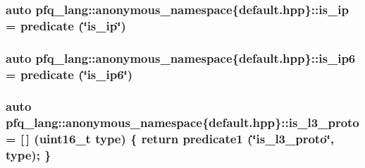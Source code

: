 \hypertarget{namespacepfq__lang_1_1anonymous__namespace_02default_8hpp_03_a43ee18537268245a58354e044a134df5}{
\subsubsection[{is\+\_\+ip}]{\setlength{\rightskip}{0pt plus 5cm}auto pfq\+\_\+lang\+::anonymous\+\_\+namespace\{default.\+hpp\}\+::is\+\_\+ip = {\bf predicate} (\char`\"{}is\+\_\+ip\char`\"{})}}\label{namespacepfq__lang_1_1anonymous__namespace_02default_8hpp_03_a43ee18537268245a58354e044a134df5}
\hypertarget{namespacepfq__lang_1_1anonymous__namespace_02default_8hpp_03_a107437a3539c86e92035db62e88b7d81}{
\subsubsection[{is\+\_\+ip6}]{\setlength{\rightskip}{0pt plus 5cm}auto pfq\+\_\+lang\+::anonymous\+\_\+namespace\{default.\+hpp\}\+::is\+\_\+ip6 = {\bf predicate} (\char`\"{}is\+\_\+ip6\char`\"{})}}\label{namespacepfq__lang_1_1anonymous__namespace_02default_8hpp_03_a107437a3539c86e92035db62e88b7d81}
\hypertarget{namespacepfq__lang_1_1anonymous__namespace_02default_8hpp_03_aa447a7b5765c5c5f9036de8358f86434}{
\subsubsection[{is\+\_\+l3\+\_\+proto}]{\setlength{\rightskip}{0pt plus 5cm}auto pfq\+\_\+lang\+::anonymous\+\_\+namespace\{default.\+hpp\}\+::is\+\_\+l3\+\_\+proto = \mbox{[}$\,$\mbox{]} (uint16\+\_\+t type) \{ return {\bf predicate1} (\char`\"{}is\+\_\+l3\+\_\+proto\char`\"{}, type); \}}}\label{namespacepfq__lang_1_1anonymous__namespace_02default_8hpp_03_aa447a7b5765c5c5f9036de8358f86434}
